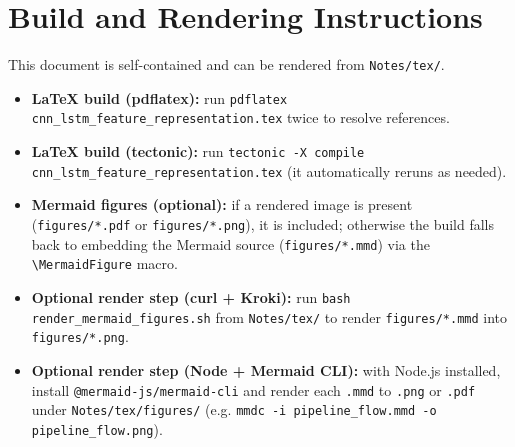 \documentclass[11pt]{article}
\begin{document}
\section{Build and Rendering Instructions}

This document is self-contained and can be rendered from \texttt{Notes/tex/}.
\begin{itemize}
  \item \textbf{LaTeX build (pdflatex):} run \texttt{pdflatex cnn\_lstm\_feature\_representation.tex} twice to resolve references.
  \item \textbf{LaTeX build (tectonic):} run \texttt{tectonic -X compile cnn\_lstm\_feature\_representation.tex} (it automatically reruns as needed).
  \item \textbf{Mermaid figures (optional):} if a rendered image is present (\texttt{figures/*.pdf} or \texttt{figures/*.png}), it is included; otherwise the build falls back to embedding the Mermaid source (\texttt{figures/*.mmd}) via the \texttt{\textbackslash MermaidFigure} macro.
  \item \textbf{Optional render step (curl + Kroki):} run \texttt{bash render\_mermaid\_figures.sh} from \texttt{Notes/tex/} to render \texttt{figures/*.mmd} into \texttt{figures/*.png}.
  \item \textbf{Optional render step (Node + Mermaid CLI):} with Node.js installed, install \texttt{@mermaid-js/mermaid-cli} and render each \texttt{.mmd} to \texttt{.png} or \texttt{.pdf} under \texttt{Notes/tex/figures/} (e.g. \texttt{mmdc -i pipeline\_flow.mmd -o pipeline\_flow.png}).
\end{itemize}
\end{document}
